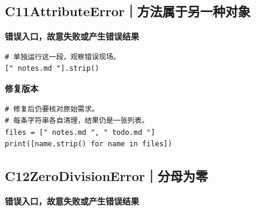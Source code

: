 
\subsection*{C11\enspace AttributeError｜方法属于另一种对象}





\textbf{错误入口，故意失败或产生错误结果}

\begin{lstlisting}[style=errorcode,title={错误复现（故意失败或错误结果）：\code{case_11_bad.py.txt}}]
# 单独运行这一段，观察错误现场。
[" notes.md "].strip()
\end{lstlisting}

\textbf{修复版本}

\begin{lstlisting}[title={\code{case_11.py}}]
# 修复后仍要核对原始需求。
# 每条字符串各自清理，结果仍是一张列表。
files = [" notes.md ", " todo.md "]
print([name.strip() for name in files])
\end{lstlisting}


\subsection*{C12\enspace ZeroDivisionError｜分母为零}





\textbf{错误入口，故意失败或产生错误结果}

